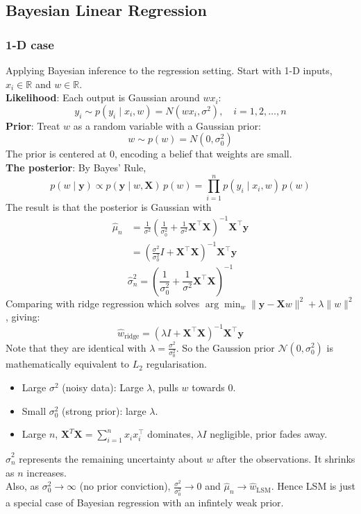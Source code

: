 \documentclass[../Probability.tex]{subfiles}
\begin{document}
\subsection{Bayesian Linear Regression}
\subsubsection{1-D case}
Applying Bayesian inference to the regression setting. Start with 1-D inputs, $x_i\in\mathbb{R}$ and $w\in\mathbb{R}$.\\
\textbf{Likelihood}: Each output is Gaussian around $wx_i$:
$$y_i \sim p(y_i \mid x_i, w) = N(wx_i, \sigma^2), \quad i = 1, 2, \ldots, n$$
\textbf{Prior}: Treat $w$ as a random variable with a Gaussian prior:
$$w \sim p(w) = N(0, \sigma_0^2)$$
The prior is centered at 0, encoding a belief that weights are small.\\
\textbf{The posterior}: By Bayes' Rule,
$$p(w \mid \mathbf{y}) \propto p(\mathbf{y} \mid w, \mathbf{X})\, p(w) = \prod_{i=1}^n p(y_i \mid x_i, w)\, p(w)$$
The result is that the posterior is Gaussian with
\begin{align*}
    \hat{\mu}_n &= \frac{1}{\sigma^2}\left(\frac{1}{\sigma_0^2} + \frac{1}{\sigma^2}\mathbf{X}^\top\mathbf{X}\right)^{-1}\mathbf{X}^\top\mathbf{y}\\
    &= \left(\frac{\sigma^2}{\sigma_0^2}I + \mathbf{X}^\top\mathbf{X}\right)^{-1}\mathbf{X}^\top\mathbf{y}
\end{align*}
$$\hat{\sigma}_n^2 = \left(\frac{1}{\sigma_0^2} + \frac{1}{\sigma^2}\mathbf{X}^\top\mathbf{X}\right)^{-1}$$
Comparing with ridge regression which solves $\arg \min_w \|\mathbf{y} - \mathbf{X}w\|^2 + \lambda \|w\|^2$, giving:
$$\hat{w}_{\text{ridge}} = \left(\lambda I + \mathbf{X}^\top\mathbf{X}\right)^{-1}\mathbf{X}^\top\mathbf{y}$$
Note that they are identical with $\lambda = \frac{\sigma^2}{\sigma^2_0}$. So the Gaussion prior $\mathcal{N}(0,\sigma_0^2)$ is mathematically equivalent to $L_2$ regularisation.
\begin{itemize}
    \item Large $\sigma^2$ (noisy data): Large $\lambda$, pulls $w$ towards 0.
    \item Small $\sigma_0^2$ (strong prior): large $\lambda$.
    \item Large $n$, $\mathbf{X}^T\mathbf{X} = \sum_{i=1}^n x_i x_i^\top$ dominates, $\lambda I$ negligible, prior fades away.
\end{itemize}
$\hat{\sigma}^2_n$ represents the remaining uncertainty about $w$ after the observations. It shrinks as $n$ increases.\\
Also, as $\sigma_0^2 \to \infty$ (no prior conviction), $\frac{\sigma^2}{\sigma_0^2} \to 0$ and $\hat{\mu}_n \to \hat{w}_{\text{LSM}}$. Hence LSM is just a special case of Bayesian regression with an infintely weak prior.
\end{document}
